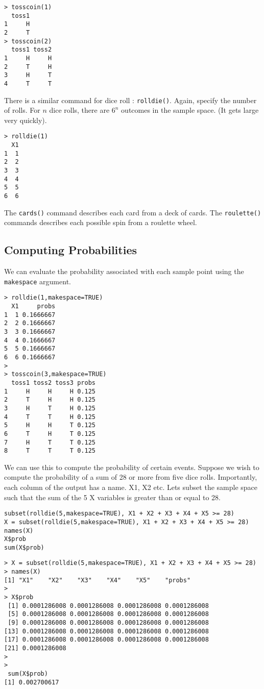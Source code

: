 \documentclass[11pt]{article} %
\begin{document}
\begin{verbatim}
> tosscoin(1)
  toss1
1     H
2     T
> tosscoin(2)
  toss1 toss2
1     H     H
2     T     H
3     H     T
4     T     T
\end{verbatim}
There is a similar command for dice roll : \texttt{rolldie()}. Again, specify the number of rolls. For $n$ dice rolls, there are $6^n$ outcomes in the sample space. (It gets large very quickly).

\begin{verbatim}
> rolldie(1)
  X1
1  1
2  2
3  3
4  4
5  5
6  6
\end{verbatim}

The \texttt{cards()} command describes each card from a deck of cards. The \texttt{roulette()} commands describes each possible spin from a roulette wheel.
\newpage
\subsection{Computing Probabilities}
We can evaluate the probability associated with each sample point using the \texttt{makespace} argument.
\begin{verbatim}
> rolldie(1,makespace=TRUE)
  X1     probs
1  1 0.1666667
2  2 0.1666667
3  3 0.1666667
4  4 0.1666667
5  5 0.1666667
6  6 0.1666667
>
> tosscoin(3,makespace=TRUE)
  toss1 toss2 toss3 probs
1     H     H     H 0.125
2     T     H     H 0.125
3     H     T     H 0.125
4     T     T     H 0.125
5     H     H     T 0.125
6     T     H     T 0.125
7     H     T     T 0.125
8     T     T     T 0.125
\end{verbatim}
We can use this to compute the probability of certain events. Suppose we wish to compute the probability of a sum of 28 or more from five dice rolls. Importantly, each column of the output has a name. X1, X2 etc. Lets subset the sample space such that the sum of the 5 X variables is greater than or equal to 28. 
\begin{framed}
\begin{verbatim}
subset(rolldie(5,makespace=TRUE), X1 + X2 + X3 + X4 + X5 >= 28)
X = subset(rolldie(5,makespace=TRUE), X1 + X2 + X3 + X4 + X5 >= 28)
names(X)
X$prob
sum(X$prob)
\end{verbatim}
\end{framed}
\newpage
\begin{verbatim}
> X = subset(rolldie(5,makespace=TRUE), X1 + X2 + X3 + X4 + X5 >= 28)
> names(X)
[1] "X1"    "X2"    "X3"    "X4"    "X5"    "probs"
>
> X$prob
 [1] 0.0001286008 0.0001286008 0.0001286008 0.0001286008
 [5] 0.0001286008 0.0001286008 0.0001286008 0.0001286008
 [9] 0.0001286008 0.0001286008 0.0001286008 0.0001286008
[13] 0.0001286008 0.0001286008 0.0001286008 0.0001286008
[17] 0.0001286008 0.0001286008 0.0001286008 0.0001286008
[21] 0.0001286008
>
>
 sum(X$prob)
[1] 0.002700617
\end{verbatim}
\end{document}
